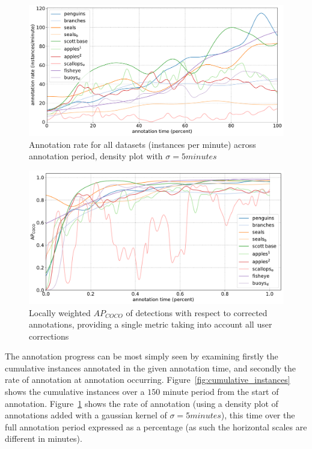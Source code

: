 \begin{figure}[H]
\centering
\includegraphics[width=1.0\linewidth]{charts/summaries/instance_rates.pdf}
\caption{ Annotation rate for all datasets (instances per minute) across annotation period, density plot with $\sigma=5minutes$ }
\label{fig:annotation_rate}
\end{figure}


\begin{figure}[H]
\centering
\includegraphics[width=1.0\linewidth]{charts/running_maps/overall.pdf}
\caption{ Locally weighted $AP_{COCO}$ of detections with respect to corrected annotations, providing a single metric taking into account all user corrections }
\label{fig:average_precision_test}
\end{figure}

The annotation progress can be most simply seen by examining firstly the cumulative instances annotated in the given annotation time, and secondly the rate of annotation at annotation occurring. Figure~\ref{fig:cumulative_instances} shows the cumulative instances over a $150$ minute period from the start of annotation. Figure~\ref{fig:annotation_rate} shows the rate of annotation (using a density plot of annotations added with a gaussian kernel of $\sigma = 5 minutes$), this time over the full annotation period expressed as a percentage (as such the horizontal scales are different in minutes).

